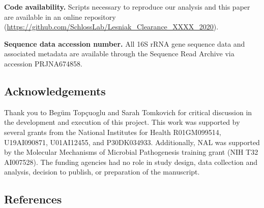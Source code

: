 \documentclass[11pt,]{article}
\begin{document}
\textbf{Code availability.} Scripts necessary to reproduce our analysis
and this paper are available in an online repository
(\url{https://github.com/SchlossLab/Lesniak_Clearance_XXXX_2020}).

\textbf{Sequence data accession number.} All 16S rRNA gene sequence data
and associated metadata are available through the Sequence Read Archive
via accession PRJNA674858.

\hypertarget{acknowledgements}{%
\subsection{Acknowledgements}\label{acknowledgements}}

Thank you to Begüm Topçuoglu and Sarah Tomkovich for critical discussion
in the development and execution of this project. This work was
supported by several grants from the National Institutes for Health
R01GM099514, U19AI090871, U01AI12455, and P30DK034933. Additionally, NAL
was supported by the Molecular Mechanisms of Microbial Pathogenesis
training grant (NIH T32 AI007528). The funding agencies had no role in
study design, data collection and analysis, decision to publish, or
preparation of the manuscript.

\newpage

\hypertarget{references}{%
\subsection{References}\label{references}}
\end{document}
